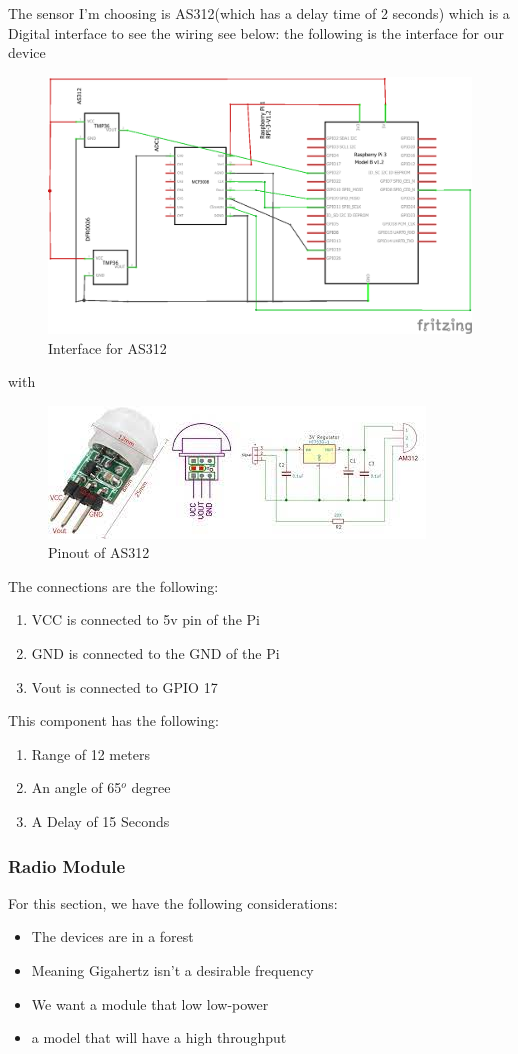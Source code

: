The sensor I'm choosing is AS312\cite{micros}(which has a delay time of 2 seconds) which is a Digital interface to see the wiring see below:
\newpage
the following is the interface for our device

\begin{figure}[h!]
	\begin{center}
		\includegraphics[width=0.5\linewidth]{Images/interfaceofAS312.png}
	\caption{Interface for AS312}
	\label{Interface for AS312}
	\end{center}

\end{figure}
with 
\begin{figure}[h!]
	\centering
	\includegraphics[width=0.5\linewidth]{Images/pinout_of_AS312.jpg}
	\caption*{Pinout of  AS312}
	\label{Pinout of  AS312}
\end{figure}
The connections are the following:
\begin{enumerate}
	\item VCC is connected  to 5v pin of the Pi
	\item GND is connected to the GND of the  Pi
	\item Vout is connected to GPIO 17
\end{enumerate}
This  component has the following:
\begin{enumerate}
	\item Range  of 12 meters 
	\item An  angle  of  65$^o$ degree
	\item A Delay of 15 \mu Seconds
\end{enumerate}

\subsubsection{Radio Module}
For this section, we have the following considerations:
\begin{itemize}
	\item The devices are in a forest
	\item Meaning  Gigahertz  isn't  a desirable frequency
	\item We want a module that low low-power
	\item a model that  will have a high throughput 
\end{itemize}

